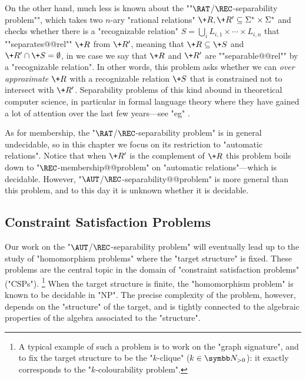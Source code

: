 \AP On the other hand, much less is known about the ""$\RAT$/$\REC$-separability problem"", which takes two $n$-ary "rational relations" 
$\+R,\+R' \subseteq \Sigma^* \times \Sigma^*$ and checks whether there is a "recognizable relation" 
$S = \bigcup_i L_{i,1} \times \cdots \times L_{i,n}$ that \AP""separates@@rel"" $\+R$ from $\+R'$, meaning that $\+R \subseteq \+S$ and $\+R' \cap \+S = \emptyset$, in we case we say that $\+R$
and $\+R'$ are \AP""separable@@rel"" by a "recognizable relation".
In other words, this problem asks whether we can \emph{over approximate} $\+R$ with a recognizable 
relation $\+S$ that is constrained not to intersect with $\+R'$. Separability problems of this kind abound in theoretical computer science, in particular
in formal language theory where they have gained a lot of attention over the last few years---see "eg" \cite{PlaceZeitoun2016SeparatingRegularLanguages,Kopczynski2016InvisiblePushdownLanguages,CzerwinskiMartensRooijenZeitounZetzsche2017DecidableSeparabilityPiecewiseTestable,ClementeCzerwinskiLasotaPaperman2017RegularSeparabilityParikhAutomata}. 

As for membership, the "$\RAT$/$\REC$-separability problem"
is in general undecidable, so in this chapter we focus on its restriction to
"automatic relations".
Notice that when $\+R'$ is the complement of $\+R$ this problem boils down to "$\REC$-membership@@problem" on "automatic relations"---which is decidable. 
However, "$\AUT$/$\REC$-separability@@problem" is more general than this problem,
and to this day it is unknown whether it is decidable. 


\subsection{Constraint Satisfaction Problems}

Our work on the "$\AUT$/$\REC$-separability problem" will eventually lead up to
the study of "homomorphism problems" where the "target structure" is fixed.
These problems are the central topic in the domain of "constraint satisfaction problems" ("CSPs").%
\footnote{A typical example of such a problem is to work on the "graph signature", and to fix the
target structure to be the "$k$-clique" ($k \in \Np$): it exactly corresponds to
the "$k$-colourability problem".}
When the target structure is finite, the "homomorphism problem" is known to be decidable
in "NP". The precise complexity of the problem, however, depends on the "structure" of the target,
and is tightly connected to the algebraic properties of the algebra associated to the
"structure".

